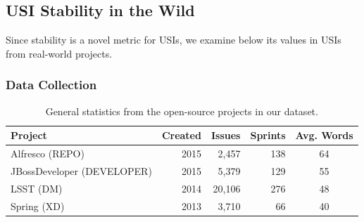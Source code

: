 








\subsection{USI Stability in the Wild}

Since stability is a novel metric for USIs, we examine below its values in USIs from real-world projects. 

\subsubsection{Data Collection}


\begin{table}[h]
    \centering
    \begin{tabular}{l|r|r|r|c}
	 \toprule
    Project & Created & Issues & Sprints & Avg. Words \\
    \midrule
      Alfresco (REPO)
      & 2015
      & 2,457
      & 138
      & 64    \\
      JBossDeveloper (DEVELOPER)
      & 2015
      & 5,379
      & 129
      & 55    \\
      LSST (DM)
      & 2014
      & 20,106
      & 276
      & 48    \\
      Spring (XD)
      & 2013
      & 3,710
      & 66
      & 40    \\
      \bottomrule
    \end{tabular}
    \caption{General statistics from the open-source projects in our dataset.}
\label{tab:statistics}
\end{table}


